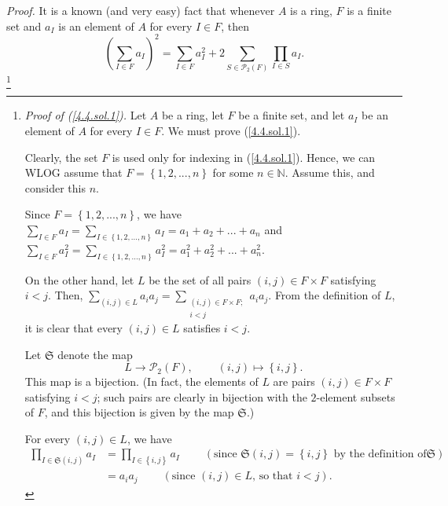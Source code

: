 \documentclass[numbers=enddot,12pt,final,onecolumn,notitlepage]{scrartcl}%
\begin{document}
\textit{Proof.} It is a known (and very easy) fact that whenever $A$ is a
ring, $F$ is a finite set and $a_{I}$ is an element of $A$ for every $I\in F$,
then%
\begin{equation}
\left(  \sum\limits_{I\in F}a_{I}\right)  ^{2}=\sum\limits_{I\in F}a_{I}%
^{2}+2\sum\limits_{S\in\mathcal{P}_{2}\left(  F\right)  }\prod\limits_{I\in
S}a_{I}. \label{4.4.sol.1}%
\end{equation}
\footnote{\textit{Proof of (\ref{4.4.sol.1}).} Let $A$ be a ring, let $F$ be a
finite set, and let $a_{I}$ be an element of $A$ for every $I\in F$. We must
prove (\ref{4.4.sol.1}).
\par
Clearly, the set $F$ is used only for indexing in (\ref{4.4.sol.1}). Hence, we
can WLOG assume that $F=\left\{  1,2,...,n\right\}  $ for some $n\in
\mathbb{N}$. Assume this, and consider this $n$.
\par
Since $F=\left\{  1,2,...,n\right\}  $, we have $\sum\limits_{I\in F}%
a_{I}=\sum\limits_{I\in\left\{  1,2,...,n\right\}  }a_{I}=a_{1}+a_{2}%
+...+a_{n}$ and $\sum\limits_{I\in F}a_{I}^{2}=\sum\limits_{I\in\left\{
1,2,...,n\right\}  }a_{I}^{2}=a_{1}^{2}+a_{2}^{2}+...+a_{n}^{2}$.
\par
On the other hand, let $L$ be the set of all pairs $\left(  i,j\right)  \in
F\times F$ satisfying $i<j$. Then, $\sum\limits_{\left(  i,j\right)  \in
L}a_{i}a_{j}=\sum\limits_{\substack{\left(  i,j\right)  \in F\times
F;\\i<j}}a_{i}a_{j}$. From the definition of $L$, it is clear that every
$\left(  i,j\right)  \in L$ satisfies $i<j$.
\par
Let $\mathfrak{S}$ denote the map%
\[
L\rightarrow\mathcal{P}_{2}\left(  F\right)  ,\ \ \ \ \ \ \ \ \ \ \left(
i,j\right)  \mapsto\left\{  i,j\right\}  .
\]
This map is a bijection. (In fact, the elements of $L$ are pairs $\left(
i,j\right)  \in F\times F$ satisfying $i<j$; such pairs are clearly in
bijection with the $2$-element subsets of $F$, and this bijection is given by
the map $\mathfrak{S}$.)
\par
For every $\left(  i,j\right)  \in L$, we have%
\begin{align*}
\prod_{I\in\mathfrak{S}\left(  i,j\right)  }a_{I}  &  =\prod_{I\in\left\{
i,j\right\}  }a_{I}\ \ \ \ \ \ \ \ \ \ \left(  \text{since }\mathfrak{S}%
\left(  i,j\right)  =\left\{  i,j\right\}  \text{ by the definition of
}\mathfrak{S}\right) \\
&  =a_{i}a_{j}\ \ \ \ \ \ \ \ \ \ \left(  \text{since }\left(  i,j\right)  \in
L\text{, so that }i<j\right)  .

\end{align*}}
\end{document}
